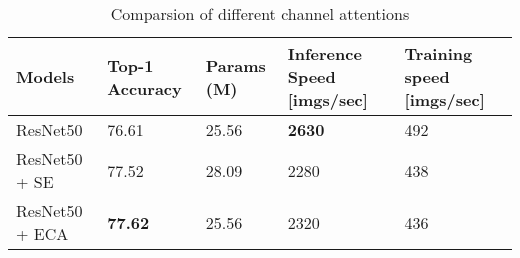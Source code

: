 \begin{table}[h!]
    \centering
    \begin{tabular}{|p{2.9cm}|p{2.7cm}|p{2cm}|p{2.8cm}|p{2.5cm}|}
    \hline
    Models & Top-1 Accuracy & Params (M) & Inference Speed {[}imgs/sec{]} & Training speed {[}imgs/sec{]} \\ \hline
    ResNet50       & 76.61          & 25.56 & \textbf{2630} & 492 \\ 
    ResNet50 + SE  & 77.52          & 28.09 & 2280          & 438 \\ 
    ResNet50 + ECA & \textbf{77.62} & 25.56 & 2320          & 436 \\ \hline
    \end{tabular}
    \caption{Comparsion of different channel attentions}
    \label{table:se_vs_eca}
    \end{table}
